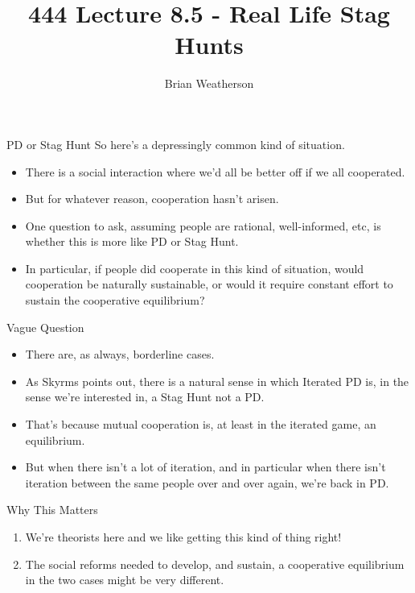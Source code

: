 \documentclass[
  ignorenonframetext,
]{beamer}
\title{444 Lecture 8.5 - Real Life Stag Hunts}
\author{Brian Weatherson}
\date{}
\providecommand{\tightlist}{%
  \setlength{\itemsep}{0pt}\setlength{\parskip}{0pt}}
\begin{document}
\frame{\titlepage}

\begin{frame}{PD or Stag Hunt}
\protect\hypertarget{pd-or-stag-hunt}{}
So here's a depressingly common kind of situation.

\begin{itemize}
\tightlist
\item
  There is a social interaction where we'd all be better off if we all
  cooperated.
\item
  But for whatever reason, cooperation hasn't arisen. \pause
\item
  One question to ask, assuming people are rational, well-informed, etc,
  is whether this is more like PD or Stag Hunt.
\item
  In particular, if people did cooperate in this kind of situation,
  would cooperation be naturally sustainable, or would it require
  constant effort to sustain the cooperative equilibrium?
\end{itemize}
\end{frame}

\begin{frame}{Vague Question}
\protect\hypertarget{vague-question}{}
\begin{itemize}
\tightlist
\item
  There are, as always, borderline cases.
\item
  As Skyrms points out, there is a natural sense in which Iterated PD
  is, in the sense we're interested in, a Stag Hunt not a PD.
\item
  That's because mutual cooperation is, at least in the iterated game,
  an equilibrium.
\item
  But when there isn't a lot of iteration, and in particular when there
  isn't iteration between the same people over and over again, we're
  back in PD.
\end{itemize}
\end{frame}

\begin{frame}{Why This Matters}
\protect\hypertarget{why-this-matters}{}
\begin{enumerate}
\tightlist
\item
  We're theorists here and we like getting this kind of thing right!
\item
  The social reforms needed to develop, and sustain, a cooperative
  equilibrium in the two cases might be very different.
\end{enumerate}
\end{frame}
\end{document}
